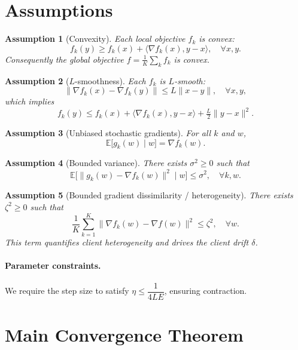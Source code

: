 \documentclass[11pt]{article}
\newtheorem{assumption}{Assumption}
\begin{document}
\section*{Assumptions}

\begin{assumption}[Convexity]\label{a:convex}
Each local objective $f_k$ is convex:
\[
f_k(y) \ge f_k(x) + \langle \nabla f_k(x), y-x\rangle, \quad \forall x,y .
\]
Consequently the global objective $f=\frac1K\sum_k f_k$ is convex.
\end{assumption}

\begin{assumption}[$L$-smoothness]\label{a:smooth}
Each $f_k$ is $L$-smooth:
\[
\|\nabla f_k(x) - \nabla f_k(y)\| \le L\|x-y\|, \quad \forall x,y,
\]
which implies
\[
f_k(y) \le f_k(x) + \langle \nabla f_k(x), y-x\rangle + \tfrac{L}{2}\|y-x\|^2 .
\]
\end{assumption}

\begin{assumption}[Unbiased stochastic gradients]\label{a:unbiased}
For all $k$ and $w$,
\[
\mathbb{E}\big[ g_k(w) \mid w \big] = \nabla f_k(w).
\]
\end{assumption}

\begin{assumption}[Bounded variance]\label{a:var}
There exists $\sigma^2 \ge 0$ such that
\[
\mathbb{E}\big[ \|g_k(w) - \nabla f_k(w)\|^2 \mid w \big] \le \sigma^2,
\quad \forall k, w .
\]
\end{assumption}

\begin{assumption}[Bounded gradient dissimilarity / heterogeneity]\label{a:hetero}
There exists $\zeta^2 \ge 0$ such that
\[
\frac{1}{K}\sum_{k=1}^{K} \|\nabla f_k(w) - \nabla f(w)\|^2 \le \zeta^2,
\quad \forall w .
\]
This term quantifies client heterogeneity and drives the client drift $\delta$.
\end{assumption}

\paragraph{Parameter constraints.}
We require the step size to satisfy $\eta \le \dfrac{1}{4LE}$, ensuring contraction.

\section*{Main Convergence Theorem}
\end{document}
